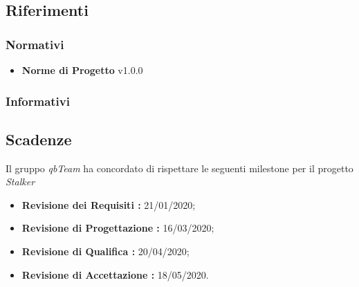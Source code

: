 \subsection{Riferimenti}
\subsubsection{Normativi}
\begin{itemize}
    \item \textbf{Norme di Progetto} v1.0.0
\end{itemize}   
\subsubsection{Informativi}


\subsection{Scadenze}
Il gruppo \textit{qbTeam} ha concordato di rispettare le seguenti milestone per il progetto \textit{Stalker}
\begin{itemize}
    \item \textbf{Revisione dei Requisiti : } 21/01/2020;
    \item \textbf{Revisione di Progettazione : } 16/03/2020;
    \item \textbf{Revisione di Qualifica : } 20/04/2020;
    \item \textbf{Revisione di Accettazione : } 18/05/2020.
\end{itemize}